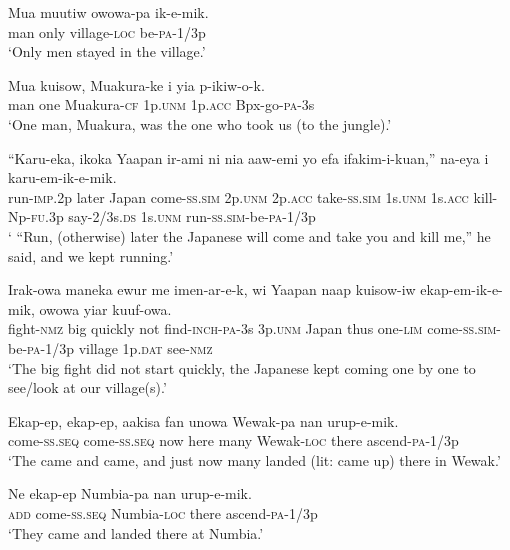 \ea
\gll  Mua  muutiw  owowa-pa  ik-e-mik. \\
man  only  village-\textsc{loc}  be-\textsc{pa}-1/3p \\
\glt ‘Only men stayed in the village.’ \\
\z


\ea
\gll  Mua  kuisow,  Muakura-ke  i  yia  p-ikiw-o-k. \\
man  one  Muakura-\textsc{cf}  1p.\textsc{unm}  1p.\textsc{acc}  Bpx-go-\textsc{pa}-3s \\
\glt ‘One man, Muakura, was the one who took us (to the jungle).’ \\
\z


\ea
\gll  “Karu-eka,  ikoka  Yaapan  ir-ami  ni  nia  aaw-emi  yo  efa  ifakim-i-kuan,”  na-eya i  karu-em-ik-e-mik. \\
run-\textsc{imp}.2p  later  Japan  come-\textsc{ss}.\textsc{sim}  2p.\textsc{unm}  2p.\textsc{acc}   take-\textsc{ss}.\textsc{sim}  1s.\textsc{unm}  1s.\textsc{acc}  kill-Np-\textsc{fu}.3p  say-2/3s.\textsc{ds} 1s.\textsc{unm}  run-\textsc{ss}.\textsc{sim}-be-\textsc{pa}-1/3p \\
\glt ‘ “Run, (otherwise) later the Japanese will come and take you and kill me,” he said, and we kept running.’ \\
\z


\ea
\gll  Irak-owa  maneka  ewur  me  imen-ar-e-k,      wi  Yaapan  naap  kuisow-iw  ekap-em-ik-e-mik, owowa  yiar  kuuf-owa. \\  
fight-\textsc{nmz}  big  quickly  not  find-\textsc{inch}-\textsc{pa}-3s 3p.\textsc{unm}  Japan  thus  one-\textsc{lim}  come-\textsc{ss}.\textsc{sim}-be-\textsc{pa}-1/3p village  1p.\textsc{dat}  see-\textsc{nmz} \\ 
\glt ‘The big fight did not start quickly, the Japanese kept coming one by one to see/look at our village(s).’ \\
\z


\ea
\gll  Ekap-ep,  ekap-ep,  aakisa  fan  unowa  Wewak-pa  nan  urup-e-mik. \\
come-\textsc{ss.seq}  come-\textsc{ss.seq}  now  here  many  Wewak-\textsc{loc} there  ascend-\textsc{pa}-1/3p \\
\glt ‘The came and came, and just now many landed (lit: came up) there in Wewak.’ \\
\z


\ea
\gll  Ne  ekap-ep  Numbia-pa  nan  urup-e-mik. \\
\textsc{add}  come{}-\textsc{ss.seq}  Numbia-\textsc{loc}  there  ascend-\textsc{pa}-1/3p \\
\glt ‘They came and landed there at Numbia.’ \\
\z


